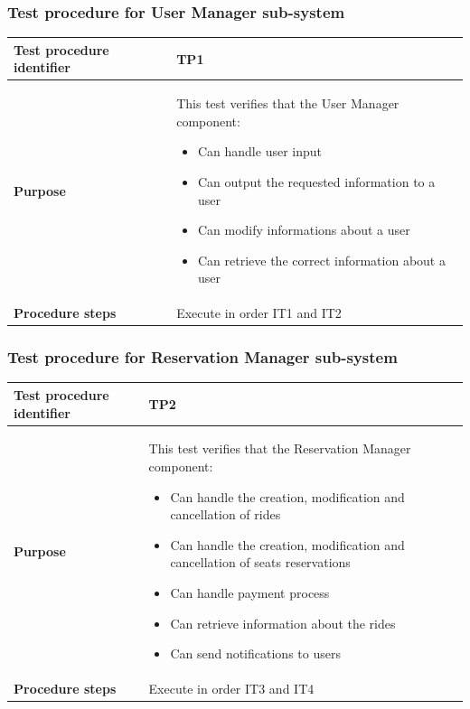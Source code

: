 \documentclass{article}
\begin{document}
			\subsubsection{Test procedure for User Manager sub-system} \label{sec:3.2.1}
				\begin{center}
					\setlength{\tabcolsep}{24pt}
					\renewcommand{\arraystretch}{1.4}
					\begin{tabular}{ | l | p{8cm} |}\hline
						\textbf{Test procedure identifier} & TP1\\\hline
						\textbf{Purpose} & This test verifies that the User Manager component:
							\begin{itemize}
								\item Can handle user input
								\item Can output the requested information to a user
								\item Can modify informations about a user
								\item Can retrieve the correct information about a user
							\end{itemize} \\\hline
						\textbf{Procedure steps} & Execute in order IT1 and IT2 \\\hline
					\end{tabular}
				\end{center}
			\subsubsection{Test procedure for Reservation Manager sub-system} \label{sec:3.2.2}
				\begin{center}
					\setlength{\tabcolsep}{24pt}
					\renewcommand{\arraystretch}{1.4}
					\begin{tabular}{ | l | p{8cm} |}\hline
						\textbf{Test procedure identifier} & TP2\\\hline
						\textbf{Purpose} & This test verifies that the Reservation Manager component:
						\begin{itemize}
							\item Can handle the creation, modification and cancellation of rides
							\item Can handle the creation, modification and cancellation of seats reservations
							\item Can handle payment process
							\item Can retrieve information about the rides
							\item Can send notifications to users
						\end{itemize} \\\hline
						\textbf{Procedure steps} & Execute in order IT3 and IT4 \\\hline
					\end{tabular}
				\end{center}
				\pagebreak
\end{document}
